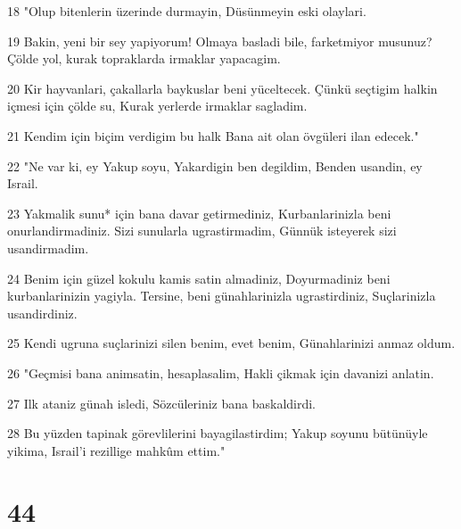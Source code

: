 \par 18 "Olup bitenlerin üzerinde durmayin, Düsünmeyin eski olaylari.
\par 19 Bakin, yeni bir sey yapiyorum! Olmaya basladi bile, farketmiyor musunuz? Çölde yol, kurak topraklarda irmaklar yapacagim.
\par 20 Kir hayvanlari, çakallarla baykuslar beni yüceltecek. Çünkü seçtigim halkin içmesi için çölde su, Kurak yerlerde irmaklar sagladim.
\par 21 Kendim için biçim verdigim bu halk Bana ait olan övgüleri ilan edecek."
\par 22 "Ne var ki, ey Yakup soyu, Yakardigin ben degildim, Benden usandin, ey Israil.
\par 23 Yakmalik sunu* için bana davar getirmediniz, Kurbanlarinizla beni onurlandirmadiniz. Sizi sunularla ugrastirmadim, Günnük isteyerek sizi usandirmadim.
\par 24 Benim için güzel kokulu kamis satin almadiniz, Doyurmadiniz beni kurbanlarinizin yagiyla. Tersine, beni günahlarinizla ugrastirdiniz, Suçlarinizla usandirdiniz.
\par 25 Kendi ugruna suçlarinizi silen benim, evet benim, Günahlarinizi anmaz oldum.
\par 26 "Geçmisi bana animsatin, hesaplasalim, Hakli çikmak için davanizi anlatin.
\par 27 Ilk ataniz günah isledi, Sözcüleriniz bana baskaldirdi.
\par 28 Bu yüzden tapinak görevlilerini bayagilastirdim; Yakup soyunu bütünüyle yikima, Israil'i rezillige mahkûm ettim."

\chapter{44}

